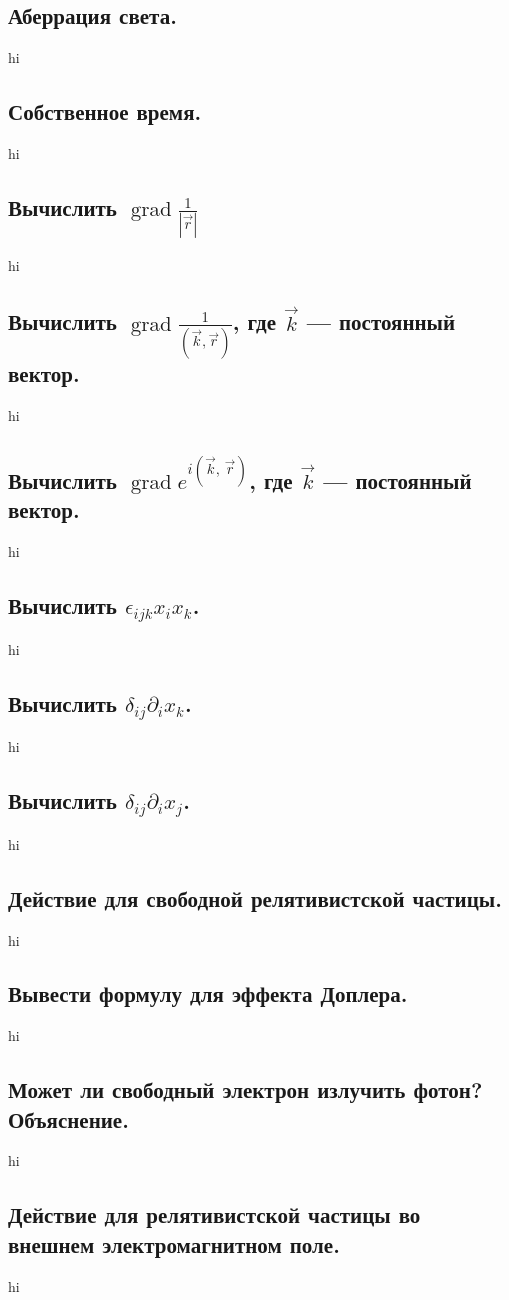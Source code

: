 \documentclass[a4paper,12pt]{article}
\begin{document}
\subsection{Аберрация света.}
hi
\subsection{Собственное время.}
hi
\subsection{Вычислить $\operatorname{grad} \frac{1}{\left| \vec{r} \right| }$}
hi
\subsection{Вычислить $\operatorname{grad}
	\frac{1}{\left( \vec{k},\vec{r}\right)}
$, где $\vec{k}$ --- постоянный вектор.}
hi
\subsection{Вычислить $\operatorname{grad} e ^{i\left( \vec{k},\,\vec{r}
\right) }$, где $\vec{k}$ --- постоянный вектор.}
hi
\subsection{Вычислить $\epsilon_{ijk}x_i x_k$.}
hi
\subsection{Вычислить $\delta_{ij}\partial_i x_k$.}
hi
\subsection{Вычислить $\delta_{ij}\partial_i x_j$.}
hi
\subsection{Действие для свободной релятивистской частицы.}
hi
\subsection{Вывести формулу для эффекта Доплера.}
hi
\subsection{Может ли свободный электрон излучить фотон? Объяснение.}
hi
\subsection{Действие для релятивистской частицы во внешнем электромагнитном
поле.}
hi
\end{document}
